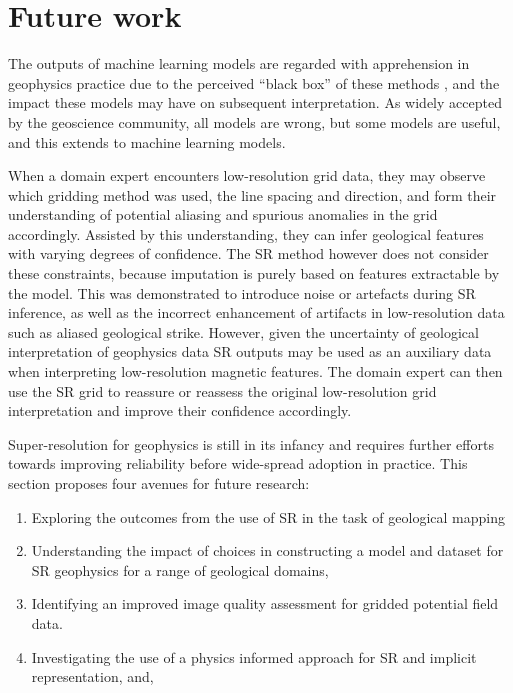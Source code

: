 % 
% 


\chapter{Future work}
\label{ch:futurework}
The outputs of machine learning models are regarded with apprehension in geophysics practice due to the perceived “black box” of these methods \parencite{delaatAlgorithmicDecisionMakingBased2018,rudinStopExplainingBlack2019}, and the impact these models may have on subsequent interpretation.
As widely accepted by the geoscience community, all models are wrong, but some models are useful, and this extends to machine learning models.

When a domain expert encounters low-resolution grid data, they may observe which gridding method was used, the line spacing and direction, and form their understanding of potential aliasing and spurious anomalies in the grid accordingly.
Assisted by this understanding, they can infer geological features with varying degrees of confidence.
The SR method however does not consider these constraints, because imputation is purely based on features extractable by the model.
This was demonstrated to introduce noise or artefacts during SR inference, as well as the incorrect enhancement of artifacts in low-resolution data such as aliased geological strike.
However, given the uncertainty of geological interpretation of geophysics data \parencite{sivarajahIdentifyingEffectiveInterpretation2013} SR outputs may be used as an auxiliary data when interpreting low-resolution magnetic features.
The domain expert can then use the SR grid to reassure or reassess the original low-resolution grid interpretation and improve their confidence accordingly.

Super-resolution for geophysics is still in its infancy and requires further efforts towards improving reliability before wide-spread adoption in practice.
This section proposes four avenues for future research:
\begin{enumerate}
    \item{} Exploring the outcomes from the use of SR in the task of geological mapping
    \item{} Understanding the impact of choices in constructing a model and dataset for SR geophysics for a range of geological domains,
    \item{} Identifying an improved image quality assessment for gridded potential field data.
    \item{} Investigating the use of a physics informed approach for SR and implicit representation, and,
\end{enumerate}

